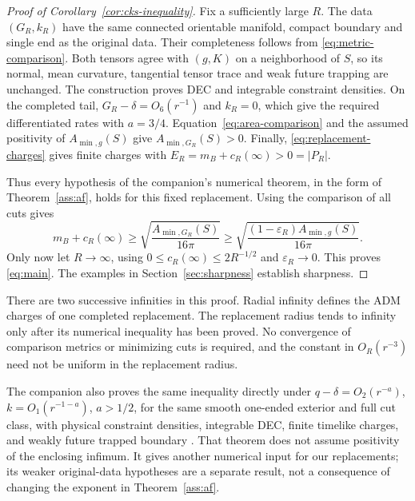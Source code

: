 \begin{proof}[Proof of Corollary~\ref{cor:cks-inequality}]
Fix a sufficiently large $R$. The data $(G_R,k_R)$ have the same
connected orientable manifold, compact boundary and single end as the
original data. Their completeness follows from
\eqref{eq:metric-comparison}. Both tensors agree with $(g,K)$ on a
neighborhood of $S$, so its normal, mean curvature, tangential tensor
trace and weak future trapping are unchanged. The construction proves
DEC and integrable constraint densities. On the completed tail,
$G_R-\delta=O_6(r^{-1})$ and $k_R=0$, which give the required
differentiated rates with $a=3/4$. Equation~\eqref{eq:area-comparison}
and the assumed positivity of $A_{\min,g}(S)$ give
$A_{\min,G_R}(S)>0$. Finally,
\eqref{eq:replacement-charges} gives finite charges with
$E_R=m_B+c_R(\infty)>0=|P_R|$.

Thus every hypothesis of the companion's numerical theorem, in the
form of Theorem~\ref{ass:af}, holds for this fixed replacement.
Using the comparison of all cuts gives
\begin{equation}\label{eq:finite-numerical}
 m_B+c_R(\infty)
 \geq\sqrt{\frac{A_{\min,G_R}(S)}{16\pi}}
 \geq\sqrt{\frac{(1-\varepsilon_R)A_{\min,g}(S)}{16\pi}}.
\end{equation}
Only now let $R\to\infty$, using $0\leq c_R(\infty)\leq2R^{-1/2}$
and $\varepsilon_R\to0$. This proves \eqref{eq:main}. The examples
in Section~\ref{sec:sharpness} establish sharpness.
\end{proof}

There are two successive infinities in this proof. Radial infinity
defines the ADM charges of one completed replacement. The replacement
radius tends to infinity only after its numerical inequality has
been proved. No convergence of comparison metrics or minimizing cuts
is required, and the constant in $O_R(r^{-3})$ need not be uniform in
the replacement radius.

\begin{remark}
The companion also proves the same inequality directly under
$q-\delta=O_2(r^{-a})$, $k=O_1(r^{-1-a})$, $a>1/2$, for the same
smooth one-ended exterior and full cut class, with physical constraint
densities, integrable DEC, finite timelike charges, and weakly future
trapped boundary \cite[Definition~7.1 and Theorem~7.2]{NumericalPenrose}.
That theorem does not assume positivity of the enclosing infimum.
It gives another numerical input for our replacements; its weaker
original-data hypotheses are a separate result, not a consequence of
changing the exponent in Theorem~\ref{ass:af}.
\end{remark}

